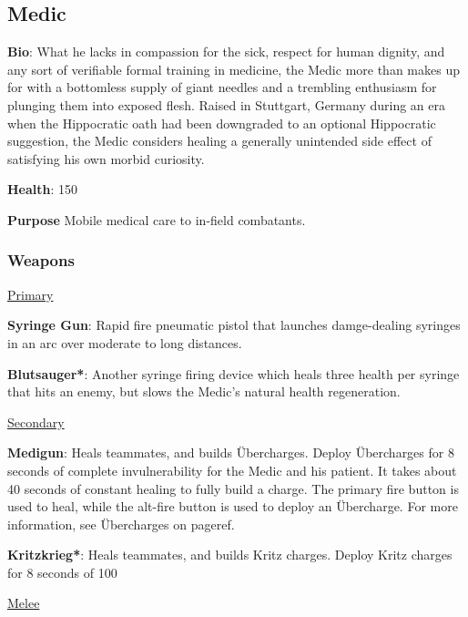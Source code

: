 \subsection{Medic}
\label{Medic}
{\bf Bio}:
What he lacks in compassion for the sick, respect for human dignity, and any sort of verifiable formal training in medicine, the Medic more than makes up for with a bottomless supply of giant needles and a trembling enthusiasm for plunging them into exposed flesh. Raised in Stuttgart, Germany during an era when the Hippocratic oath had been downgraded to an optional Hippocratic suggestion, the Medic considers healing a generally unintended side effect of satisfying his own morbid curiosity.

{\bf Health}: 150

{\bf Purpose}
Mobile medical care to in-field combatants.  

\subsubsection {Weapons}

\begin {center}
\underline {Primary}
\end {center}

{\bf Syringe Gun}: Rapid fire pneumatic pistol that launches damge-dealing syringes in an arc over moderate to long distances.

{\bf Blutsauger*}: Another syringe firing device which heals three health per syringe that hits an enemy, but slows the Medic's natural health regeneration. 


\begin {center}
\underline {Secondary}
\end {center}

{\bf Medigun}: Heals teammates, and builds Übercharges. Deploy Übercharges for 8 seconds of complete invulnerability for the Medic and his patient. It takes about 40 seconds of constant healing to fully build a charge. The primary fire button is used to heal, while the alt-fire button is used to deploy an Übercharge. For more information, see Übercharges on {{pageref}}. 

{\bf Kritzkrieg*}: Heals teammates, and builds Kritz charges. Deploy Kritz charges for 8 seconds of 100%


\begin {center}
\underline {Melee}
\end {center}

